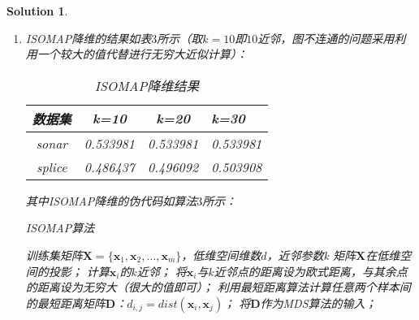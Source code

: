 \documentclass[a4paper,UTF8]{article}
\numberwithin{equation}{section}
\newtheorem*{solution}{Solution}
\begin{document}
\begin{solution}
\begin{enumerate}
	其中SVD降维的伪代码如算法$2$所示，对新数据降维时，只需乘以投影矩阵即可。
	\begin{algorithm}[htbp]  
        \caption{SVD算法}  
        \begin{algorithmic}[1] %
 			\Require 训练集矩阵$\mathbf{X}=\{\mathbf{x}_1, \mathbf{x}_2,\dots,\mathbf{x}_m\}$，低维空间维数$d$ 
	        \Ensure 投影矩阵$\mathbf{W}$
            \State 对矩阵$\mathbf{X}$进行奇异值分解：$\mathbf{X}=\mathbf{U}\mathbf{\sum}\mathbf{V^T}$；
            \State 令$\mathbf{W}$为$\mathbf{V^T}$的前$d$行组成的矩阵的转置；
            \State {}
        \end{algorithmic}  
    \end{algorithm} 

    
\newpage
	\item ISOMAP降维的结果如表$3$所示（取$k=10$即$10$近邻，图不连通的问题采用利用一个较大的值代替进行无穷大近似计算）：
	\begin{table}[htbp]
  		\centering
  		\begin{tabular}{cccp{38mm}}
	    \toprule
	    \textbf{数据集} & \textbf{k=10} & \textbf{k=20} & \textbf{k=30} \\
	    \midrule
	    sonar  & 0.533981 & 0.533981 & 0.533981\\
	    splice & 0.486437 & 0.496092 & 0.503908\\
	    \bottomrule
  		\end{tabular}
  		\caption{ISOMAP降维结果}\label{table:1}
	\end{table}

	其中ISOMAP降维的伪代码如算法$3$所示：
	\begin{algorithm}[htbp]  
        \caption{ISOMAP算法}  
        \begin{algorithmic}[1] %
 			\Require 训练集矩阵$\mathbf{X}=\{\mathbf{x}_1, \mathbf{x}_2,\dots,\mathbf{x}_m\}$，低维空间维数$d$，近邻参数k
	        \Ensure  矩阵$\mathbf{X}$在低维空间的投影；
	        	\State 计算$\mathbf{x}_i$的$k$近邻；
	        	\State 将$\mathbf{x}_i$与$k$近邻点的距离设为欧式距离，与其余点的距离设为无穷大（很大的值即可）；
	        \EndFor
	        \State 利用最短距离算法计算任意两个样本间的最短距离矩阵$\mathbf{D}$：$d_{i,j} = dist(\mathbf{x}_i, \mathbf{x}_j)$；
	        \State 将$\mathbf{D}$作为MDS算法的输入；
            \State {}
        \end{algorithmic}  
    \end{algorithm} 


\end{enumerate}
\end{solution}
\end{document}
